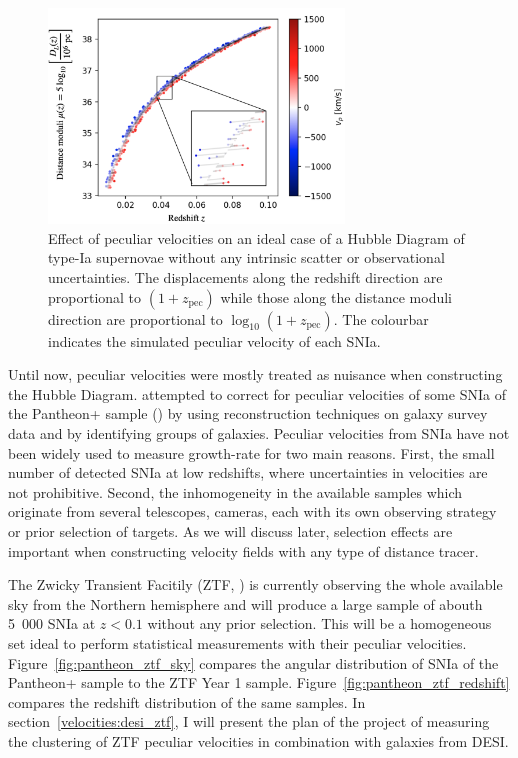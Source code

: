     \begin{figure}
        \centering 
        \includegraphics[width=0.7\textwidth]{fig/velocities/pv_hubble_diagram_snia.png}
        \caption{Effect of peculiar velocities on an ideal case of a Hubble Diagram of 
        type-Ia supernovae without any intrinsic scatter or observational uncertainties.
        The displacements along the redshift direction are proportional to $(1+z_\text{pec})$
        while those along the distance moduli direction are proportional to $\log_{10}(1+z_\text{pec})$.
        The colourbar indicates the simulated peculiar velocity of each SNIa. }
        \label{fig:pv_hubble_diagram_snia}
    \end{figure}

    Until now, peculiar velocities were mostly treated as nuisance when 
    constructing the Hubble Diagram. 
    \cite{petersonPantheonAnalysisEvaluating2021} 
    attempted to correct for peculiar velocities of some SNIa of the Pantheon+ sample 
    (\cite{scolnicPantheonAnalysisFull2021}) by using reconstruction techniques on 
    galaxy survey data and by identifying groups of galaxies. 
    Peculiar velocities from SNIa have not been widely used to measure growth-rate for two main 
    reasons. First, the small number of detected SNIa at low redshifts, where uncertainties in 
    velocities are not prohibitive. Second, the inhomogeneity in the available samples which 
    originate from several telescopes, cameras, each with its own observing strategy or 
    prior selection of targets. As we will discuss later, selection effects are important 
    when constructing velocity fields with any type of distance tracer. 
    
    The Zwicky Transient Facitily (ZTF, \cite{grahamZwickyTransientFacility2019}) 
    is currently observing the whole available sky from the Northern 
    hemisphere and will produce a large sample of abouth 5~000 SNIa at $z<0.1$ without any prior 
    selection. This will be a homogeneous set ideal to perform statistical measurements with their 
    peculiar velocities.
    Figure~\ref{fig:pantheon_ztf_sky} compares the angular distribution of SNIa of the Pantheon+ sample 
    to the ZTF Year 1 sample.  
    Figure~\ref{fig:pantheon_ztf_redshift} compares the redshift distribution of the same samples. 
    In section~\ref{velocities:desi_ztf}, I will present the plan of the project of measuring 
    the clustering of ZTF peculiar velocities in combination with galaxies from DESI. 
    
